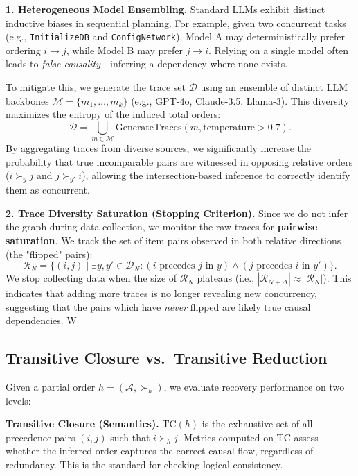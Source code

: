 \documentclass{article}
\theoremstyle{plain}
\theoremstyle{definition}
\theoremstyle{remark}
\begin{document}
\noindent \textbf{1. Heterogeneous Model Ensembling.}
Standard LLMs exhibit distinct inductive biases in sequential planning. For example, given two concurrent tasks (e.g., \texttt{InitializeDB} and \texttt{ConfigNetwork}), Model A may deterministically prefer ordering $i \to j$, while Model B may prefer $j \to i$. Relying on a single model often leads to \emph{false causality}—inferring a dependency where none exists.

To mitigate this, we generate the trace set $\mathcal{D}$ using an ensemble of distinct LLM backbones $\mathcal{M} = \{m_1, \dots, m_k\}$ (e.g., GPT-4o, Claude-3.5, Llama-3). This diversity maximizes the entropy of the induced total orders:
\[
\mathcal{D} = \bigcup_{m \in \mathcal{M}} \text{GenerateTraces}(m, \text{temperature}{>}0.7).
\]
By aggregating traces from diverse sources, we significantly increase the probability that true incomparable pairs are witnessed in opposing relative orders ($i \succ_y j$ and $j \succ_{y'} i$), allowing the intersection-based inference to correctly identify them as concurrent.

\noindent \textbf{2. Trace Diversity Saturation (Stopping Criterion).}
Since we do not infer the graph during data collection, we monitor the raw traces for \textbf{pairwise saturation}. We track the set of item pairs observed in both relative directions (the "flipped" pairs):
\[
\mathcal{R}_N = \{(i,j) \mid \exists y, y' \in \mathcal{D}_N : (i \text{ precedes } j \text{ in } y) \land (j \text{ precedes } i \text{ in } y') \}.
\]
We stop collecting data when the size of $\mathcal{R}_N$ plateaus (i.e., $|\mathcal{R}_{N+\Delta}| \approx |\mathcal{R}_N|$). This indicates that adding more traces is no longer revealing new concurrency, suggesting that the pairs which have \emph{never} flipped are likely true causal dependencies.
W

\subsection{Transitive Closure vs.\ Transitive Reduction}
\label{app:tc_tr_metrics}

Given a partial order $h=(\mathcal{A}, \succ_h)$, we evaluate recovery performance on two levels:

\noindent \textbf{Transitive Closure (Semantics).}
$\mathrm{TC}(h)$ is the exhaustive set of all precedence pairs $(i, j)$ such that $i \succ_h j$. Metrics computed on $\mathrm{TC}$ assess whether the inferred order captures the correct causal flow, regardless of redundancy. This is the standard for checking logical consistency.
\end{document}
